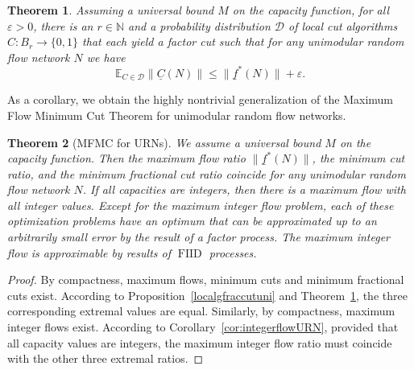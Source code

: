 \documentclass[12pt,a4paper]{article}
\newtheorem{Theorem}{Theorem}
\newcommand{\D}{\mathcal{D}}
\newcommand{\eps}{\varepsilon}
\newcommand{\E}{\mathbb{E}}
\newcommand{\N}{\mathbb{N}}
\renewcommand{\:}{\colon}
\DeclareMathOperator{\FIID}{FIID}
\begin{document}
\begin{Theorem}\label{localgcutuni}
Assuming a universal bound $M$ on the capacity function, for all $\eps > 0$, there is an $r\in \N$ and a probability distribution $\D$ of local cut algorithms $C\: B_r \rightarrow \{0,1\}$ that each yield a factor cut such that for any unimodular random flow network $N$ we have
\begin{equation*}
\E_{C \in \D} \big\|\underline{C}(N)\big\| \le \big\|\underline{f}^*(N)\big\| + \eps.
\end{equation*}
\end{Theorem}

As a corollary, we obtain the highly nontrivial generalization of the Maximum Flow Minimum Cut Theorem for unimodular random flow networks. 

\begin{Theorem}[MFMC for URNs]
We assume a universal bound $M$ on the capacity function. 
Then the maximum flow ratio $\big\|\underline{f}^*(N)\big\|$, the minimum cut ratio, and the minimum fractional cut ratio coincide for any unimodular random flow network $N$. 
If all capacities are integers, then there is a maximum flow with all integer values. 
Except for the maximum integer flow problem, each of these optimization problems have an optimum that can be approximated up to an arbitrarily small error by the result of a factor process. 
The maximum integer flow is approximable by results of $\FIID$ processes. 
\end{Theorem}\label{thm:MFMCuni}
\begin{proof}
By compactness, maximum flows, minimum cuts and minimum fractional cuts exist. 
According to Proposition~\ref{localgfraccutuni} and Theorem~\ref{localgcutuni}, the three corresponding extremal values are equal. 
Similarly, by compactness,  maximum integer flows exist. 
According to Corollary~\ref{cor:integerflowURN}, provided that all capacity values are integers, the maximum integer flow ratio must coincide with the other three extremal ratios. 
\end{proof}
\end{document}
